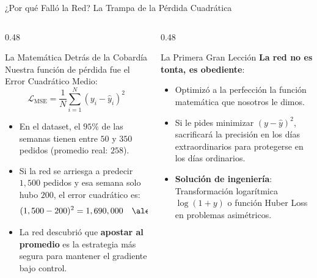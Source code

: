 \documentclass[10pt,aspectratio=169]{beamer}
\begin{document}
\begin{frame}{¿Por qué Falló la Red? La Trampa de la Pérdida Cuadrática}
  \begin{columns}[T]
    \begin{column}{0.48\textwidth}
      \begin{block}{La Matemática Detrás de la Cobardía}
        \scriptsize
        Nuestra función de pérdida fue el Error Cuadrático Medio:
        \[
          \mathcal{L}_{\text{MSE}} = \frac{1}{N} \sum_{i=1}^N (y_i - \hat{y}_i)^2
        \]
        \begin{itemize}
          \item En el dataset, el $95\%$ de las semanas tienen entre $50$ y $350$ pedidos (promedio real: $258$).
          \item Si la red se arriesga a predecir $1,500$ pedidos y esa semana solo hubo $200$, el error cuadrático es:
          \[
            (1,500 - 200)^2 = 1,690,000 \quad \text{\alert{(Pena capital)}}
          \]
          \item La red descubrió que \textbf{apostar al promedio} es la estrategia más segura para mantener el gradiente bajo control.
        \end{itemize}
      \end{block}
    \end{column}

    \begin{column}{0.48\textwidth}
      \begin{alertblock}{La Primera Gran Lección}
        \scriptsize
        \textbf{La red no es tonta, es obediente}:
        \begin{itemize}
          \item Optimizó a la perfección la función matemática que nosotros le dimos.
          \item Si le pides minimizar $(y - \hat{y})^2$, sacrificará la precisión en los días extraordinarios para protegerse en los días ordinarios.
          \item \textbf{Solución de ingeniería}: Transformación logarítmica $\log(1 + y)$ o función Huber Loss en problemas asimétricos.
        \end{itemize}
      \end{alertblock}
    \end{column}
  \end{columns}
\end{frame}
\end{document}
